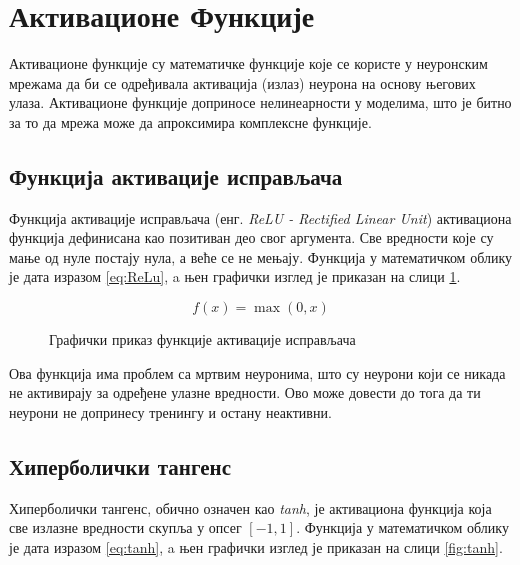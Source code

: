 \documentclass[a4paper, 12pt, master, utf8]{etf}
\begin{document}
\section{Активационе Функције}
\label{sec:24}
Активационе функције су математичке функције које се користе у неуронским мрежама да би се одређивала активација (излаз) 
неурона на основу његових улаза. Активационе функције доприносе нелинеарности у моделима, што је битно за то да мрежа може да апроксимира комплексне функције.

\subsection{Функција активације исправљача}
\label{sec:241}

Функција активације исправљача (енг. \textit{ReLU - Rectified Linear Unit}) активациона функција дефинисана као позитиван део свог аргумента. Све вредности које су мање 
од нуле постају нула, а веће се не мењају. Функција у математичком облику је дата изразом \ref{eq:ReLu}, a њен графички изглед је приказан на слици \ref{fig:relu}.

\begin{equation}
    f(x) = \max(0, x)
    \label{eq:ReLu}
\end{equation}

\begin{figure}[h]
    \centering
    \caption{Графички приказ функције активације исправљача}
    \label{fig:relu}
\end{figure}

Ова функција има проблем са мртвим неуронима, што су неурони који се никада не активирају за одређене улазне вредности. 
Ово може довести до тога да ти неурони не допринесу тренингу и остану неактивни.

\subsection{Хиперболички тангенс}
\label{sec:242}
Хиперболички тангенс, обично означен као \textit{tanh}, је активациона функција која све излазне вредности скупља у опсег $[-1, 1]$.
Функција у математичком облику је дата изразом \ref{eq:tanh}, a њен графички изглед је приказан на слици \ref{fig:tanh}.
\end{document}
